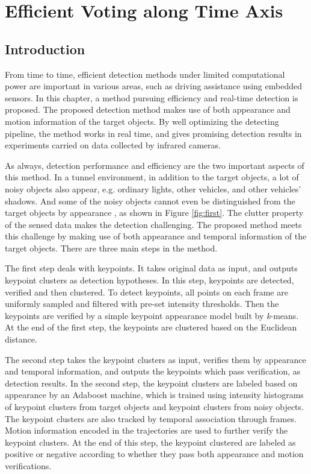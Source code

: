 \chapter{Efficient Voting along Time Axis}
\label{chp3}

\section{Introduction}

From time to time, efficient detection methods under limited computational power are important in various areas, such as driving assistance using embedded sensors. In this chapter, a method pursuing efficiency and real-time detection is proposed.
The proposed detection method makes use of both
appearance and motion information of the target objects. By well optimizing the detecting pipeline, the
method works in real time, and gives promising detection results in experiments  carried on data collected by infrared cameras.

As always, detection performance and efficiency are the two important aspects of this method.
In a tunnel environment, in addition to the target objects, a lot of noisy objects also appear, e.g. ordinary lights, other vehicles, and other vehicles' shadows. And some of the noisy objects cannot even be distinguished from the target objects by appearance , as shown in Figure \ref{fig:first}. The clutter property of the sensed data makes the detection challenging.
The proposed method meets this challenge by making use of both appearance and temporal information of the target objects.
There are three main steps in the method.

The first step deals with keypoints. It takes original data as input, and outputs keypoint clusters as detection hypotheses. In this step, keypoints are detected, verified and then clustered. To detect keypoints, all points on each frame are uniformly sampled and filtered with pre-set intensity thresholds.  Then the keypoints are verified by a simple keypoint appearance model   built by \emph{k}-means. At the end of the first step, the keypoints are clustered based on the Euclidean distance.

The second step takes the keypoint clusters as input, verifies them by appearance and temporal information, and outputs the keypoints which pass verification, as detection results. In the second step, the keypoint clusters are labeled based on appearance by an Adaboost machine, which is trained using intensity histograms of keypoint clusters from target objects and keypoint clusters from noisy objects. The keypoint clusters are also tracked by temporal association through frames. Motion information encoded in the trajectories are used to further verify the keypoint clusters. At the end of this step, the keypoint clustered are labeled as positive or negative according to whether they pass both appearance and motion verifications.

